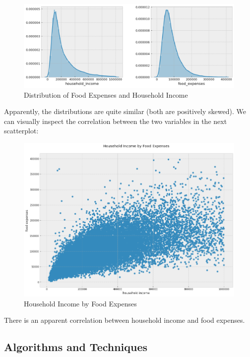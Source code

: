 \documentclass{article}
\begin{document}
\begin{figure}[H]
\caption{Distribution of Food Expenses and Household Income}
\centering
\includegraphics[width = 0.7 \textwidth]{food_expenses_income_dist}
\end{figure}

Apparently, the distributions are quite similar (both are positively skewed). We can visually inspect the correlation between the two variables in the next scatterplot:

\begin{figure}[H]
\caption{Household Income by Food Expenses}
\centering
\includegraphics[width = 0.7 \textwidth]{household_income_food_expenses}
\end{figure}

There is an apparent correlation between household income and food expenses.

\subsection{Algorithms and Techniques}
\end{document}
